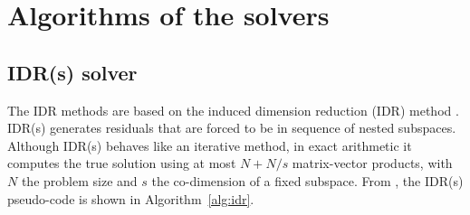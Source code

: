 \documentclass[12pt]{article}
\begin{document}
\section{Algorithms of the solvers}
\subsection{IDR(s) solver}
The IDR methods are based on the induced dimension reduction (IDR) method \citep{sonneveld2008idr}. IDR(s) generates residuals that are forced to be in sequence of nested subspaces. Although IDR(s) behaves like an iterative method, in exact arithmetic it computes the true solution using at most $N+N/s$ matrix-vector products, with $N$ the problem size and $s$ the co-dimension of a fixed subspace. From \citet{sonneveld2008idr}, the IDR(s) pseudo-code is shown in Algorithm~\ref{alg:idr}.
\end{document}
